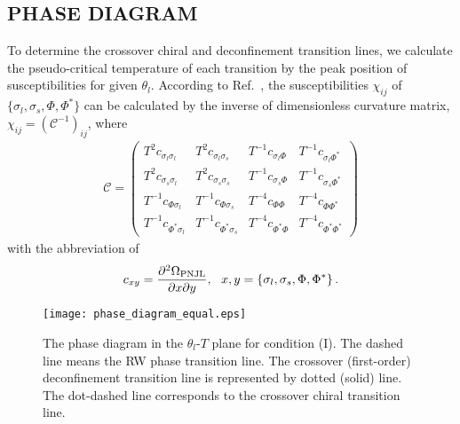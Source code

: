 \documentclass[prd,superscriptaddress,unsortedaddress,
twocolumn,showpacs,preprintnumbers,amsmath,amssymb]{revtex4}
\begin{document}
    
    \subsection{PHASE DIAGRAM}
  To determine the crossover chiral and
  deconfinement transition lines,
  we calculate the
  pseudo-critical temperature of each
  transition by the peak position of susceptibilities
  for given $\theta_{l}$.
  According to Ref.~\cite{Sasaki_sus},
  the susceptibilities $\chi_{ij}$ of $\{\sigma_{l},\sigma_{s},\Phi,\Phi^{\ast}\}$
  can be calculated by the inverse of dimensionless
  curvature matrix,
  $\chi_{ij}=\left(\mathcal{C}^{-1}\right)_{ij}$,
  where
 \begin{eqnarray}
\mathcal{C}=
\begin{pmatrix}
T^2c_{\sigma_{l}\sigma_{l}}
&
T^2c_{\sigma_{l}\sigma_{s}}
&
T^{-1}c_{\sigma_{l}\Phi}
&
T^{-1}c_{\sigma_{l}\Phi^{\ast}}
\\
T^2c_{\sigma_{s}\sigma_{l}}
&
T^2c_{\sigma_{s}\sigma_{s}}
&
T^{-1}c_{\sigma_{s}\Phi}
&
T^{-1}c_{\sigma_{s}\Phi^{\ast}}
\\
T^{-1}c_{\Phi\sigma_{l}}
&
T^{-1}c_{\Phi\sigma_{s}}
&
T^{-4}c_{\Phi\Phi}
&
T^{-4}c_{\Phi\Phi^{\ast}}
\\
T^{-1}c_{\Phi^{\ast}\sigma_{l}}
&
T^{-1}c_{\Phi^{\ast}\sigma_{s}}
&
T^{-4}c_{\Phi^{\ast}\Phi}
&
T^{-4}c_{\Phi^{\ast}\Phi^{\ast}}
\end{pmatrix}
\label{curvature_matrix}
 \end{eqnarray}
 with the abbreviation of
 \begin{eqnarray}
  c_{xy}=\frac{\partial^2\Omega_{\rm PNJL}}{\partial x\partial y},\ \ x,y=
   \left\{\sigma_{l}, \sigma_{s}, \Phi, \Phi^{\ast}\right\}.
 \end{eqnarray}

      \begin{figure}[b]
   \begin{center}
    \texttt{[image: phase\_diagram\_equal.eps]}
   \end{center}
      \caption{
       The phase diagram in the $\theta_{l}$-$T$ plane
       for condition (I).
       The dashed line means the RW phase transition line.
       The crossover (first-order) deconfinement transition line
       is represented by dotted (solid) line.
       The dot-dashed line corresponds to the crossover chiral transition line.
      }
      \label{Fig_phase_diagram1}
      \end{figure}
\end{document}
